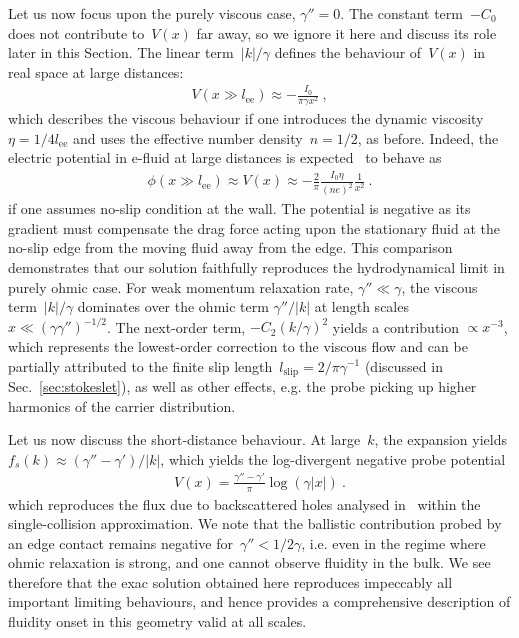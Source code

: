 \documentclass[preprint,aps,eqsecnum, prb]{revtex4-1}
\begin{document}
Let us now focus upon the purely viscous case, $\gamma'' = 0$.
The constant term~$-C_0$ does not contribute to~$V(x)$ far away,
so we ignore it here and discuss its role later in this Section.
The linear term~$|k|/\gamma$ defines the behaviour
of~$V(x)$ in real space at large distances:
\begin{align}
  V(x \gg l_\mathrm{ee}) \approx - \frac{I_0}{\pi \gamma x^2}\ ,
\end{align}
which describes the viscous behaviour if one introduces
the dynamic viscosity~$\eta = 1/4 l_\mathrm{ee}$ and uses
the effective number density~$n = 1/2$, as before.
Indeed, the electric potential in e-fluid at large distances
is expected~\cite{bib:Levitov-Falkovich} to behave as
\begin{align}
  \phi(x\gg l_\mathrm{ee})
  \approx V(x) \approx - \frac{2}{\pi} \frac{I_0 \eta}{(ne)^2}
  \frac{1}{x^2}\ . 
\end{align}
if one assumes no-slip condition at the wall. The potential is
negative as its gradient must compensate the drag force acting
upon the stationary fluid at the no-slip edge from the moving fluid
away from the edge. 
This comparison demonstrates that our solution faithfully
reproduces the hydrodynamical limit in purely ohmic case.
For weak momentum relaxation rate, $\gamma'' \ll \gamma$,
the viscous term~$|k|/\gamma$ dominates over the ohmic term
$\gamma''/|k|$ at length scales~$x \ll (\gamma \gamma'')^{-1/2}$.
The next-order term, $-C_2 (k/\gamma)^2$ yields a contribution
$\propto x^{-3}$, which represents the lowest-order
correction to the viscous flow and can be partially attributed
to the finite slip length~$l_\mathrm{slip} = 2/\pi \gamma^{-1}$
(discussed in Sec.~\ref{sec:stokeslet}),
as well as other effects, e.g. the probe picking up higher harmonics
of the carrier distribution.

Let us now discuss the short-distance behaviour.
At large~$k$, the expansion yields
$f_{s}(k) \approx (\gamma'' - \gamma') / |k|$, which yields
the log-divergent negative probe potential
\begin{align}
  V(x) = \frac{\gamma'' - \gamma'}{\pi} \log(\gamma |x|)\ .
\end{align}
which
reproduces the flux due to backscattered holes analysed
in~\cite{bib:Shytov-et-al} within  the single-collision approximation.
We note that the ballistic contribution probed by an edge contact
remains negative for~$\gamma'' < 1/2 \gamma$, i.e. even in the
regime where ohmic relaxation is strong, and one cannot observe
fluidity in the bulk. 
We see therefore that the exac solution obtained here reproduces
impeccably all important  limiting behaviours, and hence provides
a comprehensive description of fluidity onset in this geometry
valid at all scales.
\end{document}
